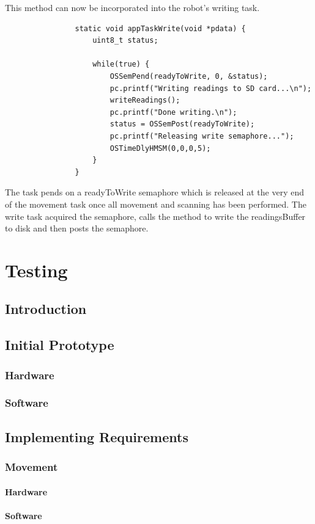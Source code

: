				This method can now be incorporated into the robot's writing task.
				
				\begin{lstlisting}
				static void appTaskWrite(void *pdata) {
					uint8_t status;
				
					while(true) {
						OSSemPend(readyToWrite, 0, &status);
						pc.printf("Writing readings to SD card...\n");
						writeReadings();
						pc.printf("Done writing.\n");
						status = OSSemPost(readyToWrite);
						pc.printf("Releasing write semaphore...");
						OSTimeDlyHMSM(0,0,0,5);
					}
				}
				\end{lstlisting}
				The task pends on a readyToWrite semaphore which is released at the very end of the movement task once all movement and scanning has been performed. The write task acquired the semaphore, calls the method to write the readingsBuffer to disk and then posts the semaphore.
	
	\chapter{Testing}
		\section{Introduction}
		\section{Initial Prototype}
			\subsection{Hardware}
			\subsection{Software}
		\section{Implementing Requirements}
			\subsection{Movement}
				\subsubsection{Hardware}
				\subsubsection{Software}
